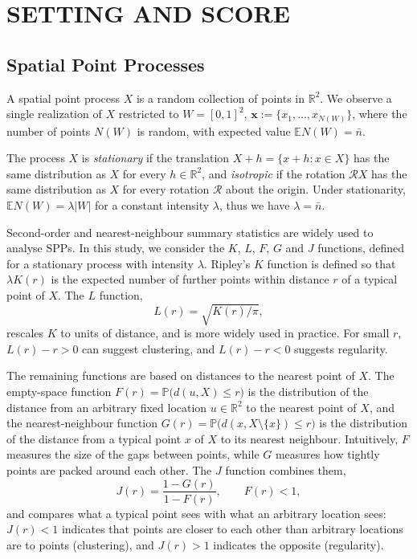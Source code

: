 \documentclass[twoside]{article}
\newcommand{\nb}{\bar n}
\newcommand{\pc}{\mathbf{x}}
\begin{document}

\section{SETTING AND SCORE}
\label{sec:setting}

\subsection{Spatial Point Processes}
\label{sec:spp}

A spatial point process $X$ is a random collection of points in $\mathbb{R}^2$. We observe a single realization of $X$ restricted to $W = [0, 1]^2$, $\pc := \{x_1, \dots, x_{N(W)}\}$,
where the number of points $N(W)$ is random, with expected value $\mathbb{E}N(W) = \nb$.

The process $X$ is \emph{stationary} if the translation
$X+h=\{x+h : x\in X\}$ has the same distribution as $X$ for every $h\in\mathbb{R}^2$, and \emph{isotropic} if the
rotation $\mathcal{R}X$ has the same distribution as $X$ for every rotation $\mathcal{R}$ about the origin.
Under stationarity, $\mathbb{E}N(W)=\lambda|W|$ for a constant intensity $\lambda$, thus we have $\lambda=\nb$.

Second-order and nearest-neighbour summary statistics are widely used to analyse SPPs. In this study, we consider the
$K$, $L$, $F$, $G$ and $J$ functions, defined for a stationary process with intensity $\lambda$. Ripley's $K$
function is defined so that $\lambda K(r)$ is the expected number of further points within distance $r$ of a typical
point of $X$. The $L$ function,
\[
  L(r)=\sqrt{K(r)/\pi},
\]
rescales $K$ to units of distance, and is more widely used in practice. For small $r$, $L(r) - r > 0$ can suggest clustering, and  $L(r) - r < 0$ suggests regularity.

The remaining functions are based on distances to the nearest point of $X$. The empty-space function
$F(r)=\mathbb{P}\bigl(d(u,X)\le r\bigr)$ is the distribution of the distance from an arbitrary fixed location
$u\in\mathbb{R}^2$ to the nearest point of $X$, and the nearest-neighbour function
$G(r)=\mathbb{P}\bigl(d(x,X\setminus\{x\})\le r\bigr)$ is the distribution of the distance from a typical point $x$ of
$X$ to its nearest neighbour. Intuitively, $F$ measures the size of the gaps between points, while $G$ measures how
tightly points are packed around each other. The $J$ function combines them,
\[
  J(r)=\frac{1-G(r)}{1-F(r)}, \qquad F(r)<1,
\]
and compares what a typical point sees with what an arbitrary location sees: $J(r)<1$ indicates that points are closer
to each other than arbitrary locations are to points (clustering), and $J(r)>1$ indicates the opposite (regularity).
\end{document}
